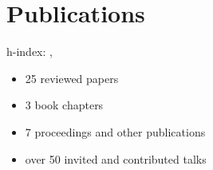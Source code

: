 \documentclass{article}
\begin{document}

\section*{Publications}

h-index: , 
\begin{itemize}
\setlength{\itemsep}{0pt}
\setlength{\parskip}{0pt}
\setlength{\parsep}{0pt}
\item 25 reviewed papers
\item 3 book chapters
\item 7 proceedings and other publications
\item over 50 invited and contributed talks 
\end{itemize}
\end{document}
